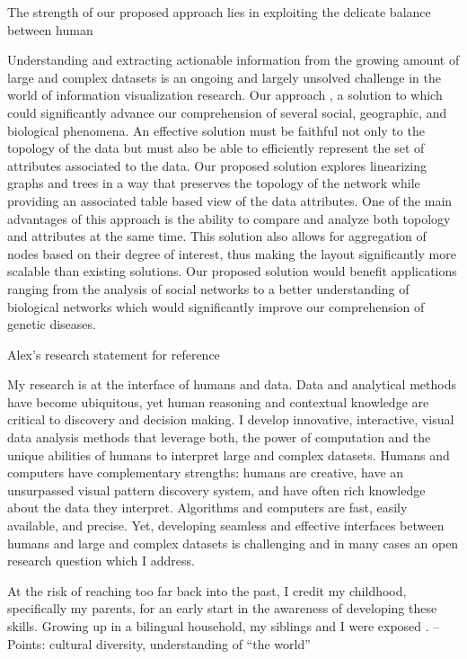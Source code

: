 The strength of our proposed approach lies in exploiting the delicate balance between human 
 
 Understanding and extracting actionable information from the growing amount of large and complex datasets is an ongoing and largely unsolved challenge in the world of information visualization research. Our approach , a solution to which could significantly advance our comprehension of several social, geographic, and biological phenomena. An effective solution must be faithful not only to the topology of the data but must also be able to efficiently represent the set of attributes associated to the data. Our proposed solution explores linearizing graphs and trees in a way that preserves the topology of the network while providing an associated table based view of the data attributes. One of the main advantages of this approach is the ability to compare and analyze both topology and attributes at the same time. This solution also allows for aggregation of nodes based on their degree of interest, thus making the layout significantly more scalable than existing solutions. Our proposed solution would benefit applications ranging from the analysis of social networks to a better understanding of biological networks which would significantly improve our comprehension of genetic diseases.
 
 

Alex's research statement for reference


My research is at the interface of humans and data. Data and analytical methods have become ubiquitous, yet human reasoning and contextual knowledge are critical to discovery and decision making. I develop innovative, interactive, visual data analysis methods that leverage both, the power of computation and the unique abilities of humans to interpret large and complex datasets. Humans and computers have complementary strengths: humans are creative, have an unsurpassed visual pattern discovery system, and have often rich knowledge about the data they interpret. Algorithms and computers are fast, easily available, and precise. Yet, developing seamless and effective interfaces between humans and large and complex datasets is challenging and in many cases an open research question which I address.


At the risk of reaching too far back into the past, I credit my childhood, specifically my parents, for an early start in the awareness of developing these skills. Growing up in a bilingual household, my siblings and I were exposed .  – 
Points: cultural diversity, understanding of “the world”


